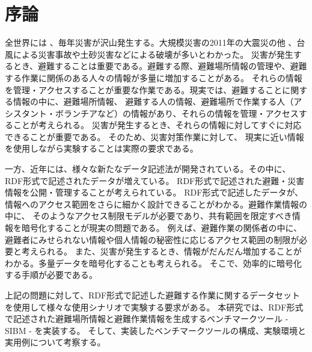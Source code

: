 ﻿%
\chapter{序論}

全世界には 、毎年災害が沢山発生する。大規模災害の2011年の大震災の他 、台風による災害事故や土砂災害などによる破壊が多いとわかった。
災害が発生するとき、避難することは重要である。避難する際、避難場所情報の管理や、避難する作業に関係のある人々の情報が多量に増加することがある。
それらの情報を管理・アクセスすることが重要な作業である。現実では、避難することに関する情報の中に、避難場所情報、
避難する人の情報、避難場所で作業する人（アシスタント・ボランチアなど）の情報があり、それらの情報を管理・アクセスすることが考えられる。
災害が発生するとき、それらの情報に対してすぐに対応できることが重要である。 そのため、災害対策作業に対して、
現実に近い情報を使用しながら実験することは実際の要求である。

一方、近年には、様々な新たなデータ記述法が開発されている。その中に、RDF形式で記述されたデータが増えている。
RDF形式で記述された避難・災害情報を公開・管理することが考えられている\cite{cite:opendata}。
RDF形式で記述したデータが、情報へのアクセス範囲をさらに細かく設計できることがわかる。避難作業情報の中に、
そのようなアクセス制限モデルが必要であり、共有範囲を限定すべき情報を暗号化することが現実の問題である。
例えば、避難作業の関係者の中に、避難者にみせられない情報や個人情報の秘密性に応じるアクセス範囲の制限が必要と考えられる\cite{cite:kodama}。
また、災害が発生するとき、情報がだんだん増加することがわかる。多量データを暗号化することも考えられる。
そこで、効率的に暗号化する手順が必要である\cite{cite:dat}。

上記の問題に対して、RDF形式で記述した避難する作業に関するデータセットを使用して様々な使用シナリオで実験する要求がある。
本研究では、RDF形式で記述された避難場所情報と避難作業情報を生成するベンチマークツール - SIBM - を実装する。
そして、実装したベンチマークツールの構成、実験環境と実用例について考察する。
